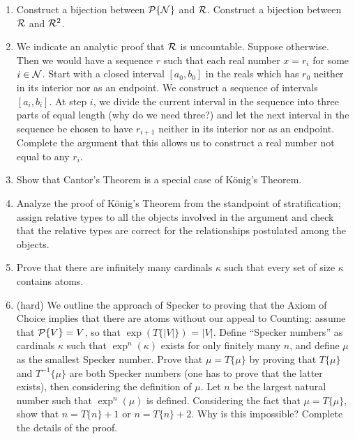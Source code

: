 \Exercises

\begin{enumerate}
\item  Construct a bijection between ${\cal P}\{\cal N\}$ and
  $\cal R$.  Construct a bijection between $\cal R$ and ${\cal R}^2$.

\item  We indicate an analytic proof that $\cal R$ is
  uncountable.  Suppose otherwise.  Then we would have a
  sequence $r$ such that each real number
  $x = r_i$ for some $i \in {\cal N}$.  Start with a closed interval
  $[a_0,b_0]$ in the reals which has $r_0$ neither in its interior nor as an
  endpoint.  We construct a sequence of intervals $[a_i,b_i]$.  At step $i$, we
  divide the current interval in the sequence into three parts of equal length
  (why do we need three?) and let the next interval in the sequence be chosen
  to have $r_{i+1}$ neither in its interior nor as an endpoint.  Complete the
  argument that this allows us to construct a real number not equal to any
  $r_i$.

\item  Show that Cantor's Theorem is a special case of
  K\"onig's Theorem.

\item  Analyze the proof of K\"onig's Theorem from the standpoint of
  stratification; assign relative types to all the objects involved in the argument and check that the
  relative types are correct for the relationships postulated among the
  objects.

\item  Prove that there are infinitely many cardinals
  $\kappa$ such that every set of size $\kappa$ contains atoms.

\item  (hard) We outline the approach of Specker to
  proving that the Axiom of Choice implies that there
  are atoms without our appeal to Counting: assume
  that ${\cal P}\{V\} = V$, so that $\exp(T\{|V|\})$ = $|V|$. Define ``Specker numbers'' as cardinals $\kappa$ such
  that $\exp^n(\kappa)$ exists for only finitely many $n$, and define $\mu$ as
  the smallest Specker number.  Prove that $\mu = T\{\mu\}$ by proving that
  $T\{\mu\}$ and $T^{-1}\{\mu\}$ are both Specker numbers (one has to prove
  that the latter exists), then considering the definition of $\mu$.  Let $n$
  be the largest natural number such that $\exp^n(\mu)$
  is defined. Considering the fact that $\mu = T\{\mu\}$, show that $n=
  T\{n\}+1$ or $n= T\{n\}+2$.  Why is
  this impossible?  Complete the details of the proof.


\end{enumerate}
